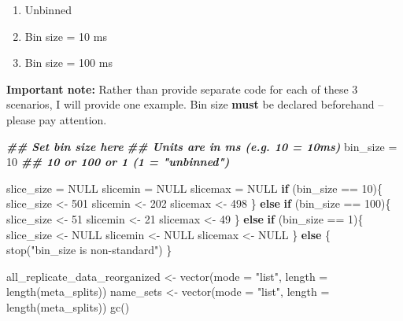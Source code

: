 \documentclass[
]{book}
\newenvironment{Shaded}{\begin{snugshade}}{\end{snugshade}}
\newcommand{\AttributeTok}[1]{\textcolor[rgb]{0.77,0.63,0.00}{#1}}
\newcommand{\ConstantTok}[1]{\textcolor[rgb]{0.00,0.00,0.00}{#1}}
\newcommand{\ControlFlowTok}[1]{\textcolor[rgb]{0.13,0.29,0.53}{\textbf{#1}}}
\newcommand{\DecValTok}[1]{\textcolor[rgb]{0.00,0.00,0.81}{#1}}
\newcommand{\DocumentationTok}[1]{\textcolor[rgb]{0.56,0.35,0.01}{\textbf{\textit{#1}}}}
\newcommand{\FunctionTok}[1]{\textcolor[rgb]{0.00,0.00,0.00}{#1}}
\newcommand{\NormalTok}[1]{#1}
\newcommand{\OtherTok}[1]{\textcolor[rgb]{0.56,0.35,0.01}{#1}}
\newcommand{\SpecialCharTok}[1]{\textcolor[rgb]{0.00,0.00,0.00}{#1}}
\newcommand{\StringTok}[1]{\textcolor[rgb]{0.31,0.60,0.02}{#1}}
\providecommand{\tightlist}{%
  \setlength{\itemsep}{0pt}\setlength{\parskip}{0pt}}
\begin{document}
\begin{enumerate}
\def\labelenumi{\arabic{enumi}.}
\tightlist
\item
  Unbinned
\item
  Bin size = 10 ms
\item
  Bin size = 100 ms
\end{enumerate}

\textbf{Important note:} Rather than provide separate code for each of these 3
scenarios, I will provide one example. Bin size \textbf{must} be declared beforehand
-- please pay attention.

\begin{Shaded}
\begin{Highlighting}[]
\DocumentationTok{\#\# Set bin size here}
\DocumentationTok{\#\# Units are in ms (e.g. 10 = 10ms)}
\NormalTok{bin\_size }\OtherTok{=} \DecValTok{10} \DocumentationTok{\#\# 10 or 100 or 1 (1 = "unbinned")}

\NormalTok{slice\_size }\OtherTok{=} \ConstantTok{NULL}
\NormalTok{slicemin }\OtherTok{=} \ConstantTok{NULL}
\NormalTok{slicemax }\OtherTok{=} \ConstantTok{NULL}
\ControlFlowTok{if}\NormalTok{ (bin\_size }\SpecialCharTok{==} \DecValTok{10}\NormalTok{)\{}
\NormalTok{  slice\_size }\OtherTok{\textless{}{-}} \DecValTok{501}
\NormalTok{  slicemin }\OtherTok{\textless{}{-}} \DecValTok{202}
\NormalTok{  slicemax }\OtherTok{\textless{}{-}} \DecValTok{498}
\NormalTok{\} }\ControlFlowTok{else} \ControlFlowTok{if}\NormalTok{ (bin\_size }\SpecialCharTok{==} \DecValTok{100}\NormalTok{)\{}
\NormalTok{  slice\_size }\OtherTok{\textless{}{-}} \DecValTok{51}
\NormalTok{  slicemin }\OtherTok{\textless{}{-}} \DecValTok{21}
\NormalTok{  slicemax }\OtherTok{\textless{}{-}} \DecValTok{49}
\NormalTok{\} }\ControlFlowTok{else} \ControlFlowTok{if}\NormalTok{ (bin\_size }\SpecialCharTok{==} \DecValTok{1}\NormalTok{)\{}
\NormalTok{  slice\_size }\OtherTok{\textless{}{-}} \ConstantTok{NULL}
\NormalTok{  slicemin }\OtherTok{\textless{}{-}} \ConstantTok{NULL}
\NormalTok{  slicemax }\OtherTok{\textless{}{-}} \ConstantTok{NULL}
\NormalTok{\} }\ControlFlowTok{else}\NormalTok{ \{}
  \FunctionTok{stop}\NormalTok{(}\StringTok{"bin\_size is non{-}standard"}\NormalTok{)}
\NormalTok{\}}


\NormalTok{all\_replicate\_data\_reorganized }\OtherTok{\textless{}{-}}
  \FunctionTok{vector}\NormalTok{(}\AttributeTok{mode =} \StringTok{"list"}\NormalTok{, }\AttributeTok{length =} \FunctionTok{length}\NormalTok{(meta\_splits))}
\NormalTok{name\_sets }\OtherTok{\textless{}{-}}
  \FunctionTok{vector}\NormalTok{(}\AttributeTok{mode =} \StringTok{"list"}\NormalTok{, }\AttributeTok{length =} \FunctionTok{length}\NormalTok{(meta\_splits))}
\FunctionTok{gc}\NormalTok{()}
\end{Highlighting}
\end{Shaded}
\end{document}
